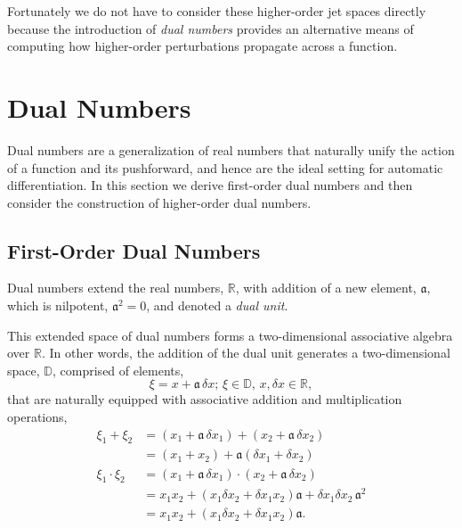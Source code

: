 Fortunately we do not have to consider these higher-order jet spaces directly
because the introduction of \textit{dual numbers} provides an alternative means
of computing how higher-order perturbations propagate across a function.

\section{Dual Numbers}

Dual numbers are a generalization of real numbers that naturally unify the
action of a function and its pushforward, and hence are the ideal setting for
automatic differentiation.  In this section we derive first-order dual numbers
and then consider the construction of higher-order dual numbers.

\subsection{First-Order Dual Numbers}

Dual numbers extend the real numbers, $\mathbb{R}$, with
addition of a new element, $\mathfrak{a}$, which is nilpotent, $\mathfrak{a}^{2} = 0$,
and denoted a \textit{dual unit}.

This extended space of dual numbers forms a two-dimensional associative algebra 
over $\mathbb{R}$.  In other words, the addition of the dual unit generates a two-dimensional
space, $\mathbb{D}$, comprised of elements,
%
\begin{equation*}
\xi = x + \mathfrak{a} \, \delta x; \, \xi \in \mathbb{D}, \, x, \delta x \in \mathbb{R},
\end{equation*}
%
that are naturally equipped with associative addition and multiplication operations,
%
\begin{align*}
\xi_{1} + \xi_{2} 
&=
 \left( x_{1} + \mathfrak{a} \, \delta x_{1} \right) 
 + \left( x_{2} + \mathfrak{a} \,  \delta x_{2} \right) 
\\
&=
\left( x_{1} + x_{2} \right) 
+ \mathfrak{a} \left( \delta x_{1} + \delta x_{2} \right) 
\\
\xi_{1} \cdot \xi_{2} 
&= 
\left( x_{1} + \mathfrak{a} \, \delta x_{1} \right) 
\cdot \left( x_{2} + \mathfrak{a} \, \delta x_{2} \right) 
\\
&= 
x_{1} x_{2} + \left( x_{1} \delta x_{2} 
+ \delta x_{1} x_{2} \right) \mathfrak{a} 
+ \delta x_{1} \delta x_{2} \, \mathfrak{a}^{2} 
\\
&= 
x_{1} x_{2} + \left( x_{1} \delta x_{2} + \delta x_{1} x_{2} \right) \mathfrak{a}.
\end{align*}  

